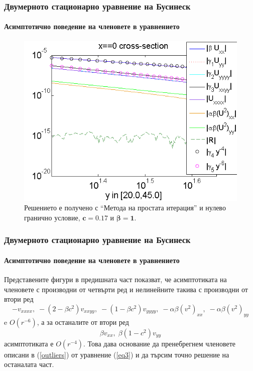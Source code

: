 \documentclass{beamer}
\newcommand{\rf}[1]{(\ref{#1})}
\begin{document}
\begin{frame}
\frametitle{Двумерното стационарно уравнение на Бусинеск}
\framesubtitle{Асимптотично поведение на членовете в уравнението}
\begin{figure}
	\includegraphics[width=0.8\linewidth]{../Thesis/AssymptForEachTerm/c017_bt1_5/ChristovIC_AlongY_50_ZB2_bt1_c017_h020_O(h^6).png}
	\caption{ Решението е получено с ``Метода на простата итерация'' и нулево гранично условие, $\boldsymbol{c=0.17}$ и $\boldsymbol{\beta = 1}$. }
	\label{fig:assympt_c017bt12}
\end{figure}


\end{frame}

\begin{frame}
\frametitle{Двумерното стационарно уравнение на Бусинеск}
\framesubtitle{Асимптотично поведение на членовете в уравнението}
Представените фигури в предишната част показват, че асимптотиката на членовете с производни от четвърти ред и нелинейните такива с производни от втори ред
\begin{equation}\label{outliers}
- v_{xxxx}, \;  - (2-\beta c^2)v_{xxyy},  \;  - (1-\beta c^2)v_{yyyy}, \;  - \alpha \beta (v^2)_{xx}, \; - \alpha \beta (v^2)_{yy}
\end{equation}
e $O(r^{-6})$, а за останалите от втори ред
$$
\beta v_{xx}, \; \beta (1-c^2) v_{yy}
$$
асимптотиката е $O(r^{-4})$. Това дава основание да пренебрегнем членовете описани в \rf{outliers} от уравнение \rf{eq3} и да търсим точно решение на останалата част.
\end{frame}
\end{document}
